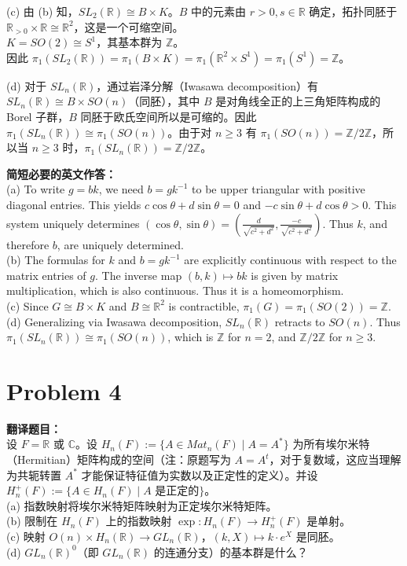 \documentclass{ctexart}
\begin{document}
(c) 由 (b) 知，$SL_2(\mathbb{R}) \cong B \times K$。$B$ 中的元素由 $r > 0, s \in \mathbb{R}$ 确定，拓扑同胚于 $\mathbb{R}_{>0} \times \mathbb{R} \cong \mathbb{R}^2$，这是一个可缩空间。\\
$K = SO(2) \cong S^1$，其基本群为 $\mathbb{Z}$。\\
因此 $\pi_1(SL_2(\mathbb{R})) = \pi_1(B \times K) = \pi_1(\mathbb{R}^2 \times S^1) = \pi_1(S^1) = \mathbb{Z}$。

(d) 对于 $SL_n(\mathbb{R})$，通过岩泽分解（Iwasawa decomposition）有 $SL_n(\mathbb{R}) \cong B \times SO(n)$（同胚），其中 $B$ 是对角线全正的上三角矩阵构成的 Borel 子群，$B$ 同胚于欧氏空间所以是可缩的。因此 $\pi_1(SL_n(\mathbb{R})) \cong \pi_1(SO(n))$。由于对 $n \ge 3$ 有 $\pi_1(SO(n)) = \mathbb{Z}/2\mathbb{Z}$，所以当 $n \ge 3$ 时，$\pi_1(SL_n(\mathbb{R})) = \mathbb{Z}/2\mathbb{Z}$。

\vspace{1em}
\textbf{简短必要的英文作答：}\\
(a) To write $g = bk$, we need $b = gk^{-1}$ to be upper triangular with positive diagonal entries. This yields $c\cos\theta + d\sin\theta = 0$ and $-c\sin\theta + d\cos\theta > 0$. This system uniquely determines $(\cos\theta, \sin\theta) = (\frac{d}{\sqrt{c^2+d^2}}, \frac{-c}{\sqrt{c^2+d^2}})$. Thus $k$, and therefore $b$, are uniquely determined.\\
(b) The formulas for $k$ and $b=gk^{-1}$ are explicitly continuous with respect to the matrix entries of $g$. The inverse map $(b, k) \mapsto bk$ is given by matrix multiplication, which is also continuous. Thus it is a homeomorphism.\\
(c) Since $G \cong B \times K$ and $B \cong \mathbb{R}^2$ is contractible, $\pi_1(G) = \pi_1(SO(2)) = \mathbb{Z}$.\\
(d) Generalizing via Iwasawa decomposition, $SL_n(\mathbb{R})$ retracts to $SO(n)$. Thus $\pi_1(SL_n(\mathbb{R})) \cong \pi_1(SO(n))$, which is $\mathbb{Z}$ for $n=2$, and $\mathbb{Z}/2\mathbb{Z}$ for $n \ge 3$.

\vspace{2em}
\section*{Problem 4}
\textbf{翻译题目：}\\
设 $F = \mathbb{R}$ 或 $\mathbb{C}$。设 $H_n(F) := \{A \in Mat_n(F) \mid A = A^*\}$ 为所有埃尔米特（Hermitian）矩阵构成的空间（注：原题写为 $A = A^t$，对于复数域，这应当理解为共轭转置 $A^*$ 才能保证特征值为实数以及正定性的定义）。并设 $H_n^+(F) := \{A \in H_n(F) \mid A \text{ 是正定的}\}$。\\
(a) 指数映射将埃尔米特矩阵映射为正定埃尔米特矩阵。\\
(b) 限制在 $H_n(F)$ 上的指数映射 $\exp: H_n(F) \to H_n^+(F)$ 是单射。\\
(c) 映射 $O(n) \times H_n(\mathbb{R}) \to GL_n(\mathbb{R})$，$(k, X) \mapsto k \cdot e^X$ 是同胚。\\
(d) $GL_n(\mathbb{R})^0$（即 $GL_n(\mathbb{R})$ 的连通分支）的基本群是什么？
\end{document}

